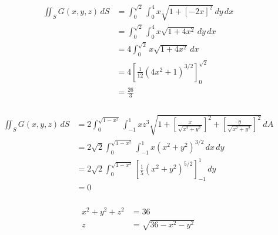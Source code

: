 \documentclass{article}
\begin{document}
\setcounter{subsubsection}{14}
\subsubsection{}

\begin{align*}
  \iint_S G(x, y, z) \,dS & = \int_0^{\sqrt{2}} \int_0^4 x \sqrt{1 + [-2 x]^2} \,dy \,dx     \\
                          & = \int_0^{\sqrt{2}} \int_0^4 x \sqrt{1 + 4 x^2} \,dy \,dx        \\
                          & = 4 \int_0^{\sqrt{2}} x \sqrt{1 + 4 x^2} \,dx                    \\
                          & = 4 \left[ \frac{1}{12} (4 x^2 + 1)^{3 / 2} \right]_0^{\sqrt{2}} \\
                          & = \frac{26}{3}
\end{align*}

\setcounter{subsubsection}{16}
\subsubsection{}

\begin{align*}
  \iint_S G(x, y, z) \,dS & = 2 \int_0^{\sqrt{1 - x^2}} \int_{-1}^1 x z^3 \sqrt{1 + \left[ \frac{x}{\sqrt{x^2 + y^2}} \right]^2 + \left[ \frac{y}{\sqrt{x^2 + y^2}} \right]^2} \,dA \\
                          & = 2 \sqrt{2} \int_0^{\sqrt{1 - x^2}} \int_{-1}^1 x (x^2 + y^2)^{3 / 2} \,dx \,dy                                                                        \\
                          & = 2 \sqrt{2} \int_0^{\sqrt{1 - x^2}} \left[ \frac{1}{5} (x^2 + y^2)^{5 / 2} \right]_{-1}^1 \,dy                                                         \\
                          & = 0
\end{align*}

\setcounter{subsubsection}{18}
\subsubsection{}

\begin{align*}
  x^2 + y^2 + z^2 & = 36                    \\
  z               & = \sqrt{36 - x^2 - y^2} \\
\end{align*}
\end{document}
